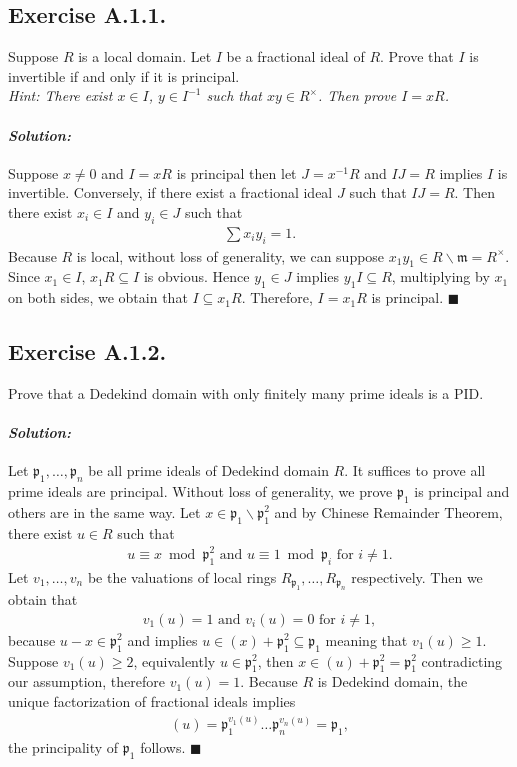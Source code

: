 \documentclass[12pt, a4paper]{article}
\newenvironment{solution}
  {\paragraph{\textit{Solution:}}\par\medskip}
  {\hfill$\blacksquare$\vspace{0.1cm}}
\begin{document}
\subsection*{Exercise A.1.1.} 
Suppose $R$ is a local domain. Let $I$ be a fractional ideal of $R$. Prove that $I$ is invertible if and only if it is principal. \\
\emph{Hint: There exist $x \in I$, $y \in I^{-1}$ such that $xy \in R^{\times}$. Then prove $I = xR$.}
\begin{solution}
    Suppose $x\neq 0$ and $I=xR$ is principal then let $J=x^{-1}R$ and $IJ=R$ implies $I$ is invertible. Conversely, if there exist a fractional ideal $J$ such that $IJ=R$. Then there exist $x_i\in I$ and $y_i\in J$ such that
    \begin{align*}
        \sum x_iy_i = 1.
    \end{align*} 
    Because $R$ is local, without loss of generality, we can suppose $x_1y_1\in R\backslash \mathfrak{m}=R^{\times}$. Since $x_1\in I$, $x_1R\subseteq I$ is obvious. Hence $y_1\in J$ implies $y_1I\subseteq R$, multiplying by $x_1$ on both sides, we obtain that 
    $I\subseteq x_1 R$. Therefore, $I=x_1R$ is principal.
\end{solution}


\subsection*{Exercise A.1.2.} 
Prove that a Dedekind domain with only finitely many prime ideals is a PID.
\begin{solution}
    Let $\mathfrak{p}_1,\dots,\mathfrak{p}_n$ be all prime ideals of Dedekind domain $R$.
    It suffices to prove all prime ideals are principal. Without loss of generality, we prove $\mathfrak{p}_1$ is principal and others are in 
    the same way. Let $x\in \mathfrak{p}_1\backslash \mathfrak{p}_1^2$ and by Chinese Remainder Theorem, there exist $u\in R$ such that 
    \begin{align*}
        u\equiv x \bmod \mathfrak{p}_1^2 \text{ and } u\equiv 1 \bmod \mathfrak{p}_i\text{ for }i\neq 1.
    \end{align*} 
    Let $v_1,\dots,v_n$ be the valuations of local rings $R_{\mathfrak{p}_1},\dots,R_{\mathfrak{p}_n}$ respectively. Then we obtain that 
    \begin{align*}
        v_1(u) = 1 \text{ and } v_i(u) = 0\text{ for }i\neq 1,
    \end{align*}
    because $u-x\in \mathfrak{p}_1^2$ and implies $u\in (x)+\mathfrak{p}_1^2\subseteq \mathfrak{p}_1$ meaning that $v_1(u)\ge 1$. Suppose $v_1(u)\ge 2$, equivalently $u\in \mathfrak{p}_1^2$, then $x\in (u)+\mathfrak{p}_1^2 = \mathfrak{p}_1^2$ contradicting our
    assumption, therefore $v_1(u)=1$. Because $R$ is Dedekind domain, the unique factorization of fractional ideals implies 
    \begin{align*}
        (u) = \mathfrak{p}_1^{v_1(u)}\dots\mathfrak{p}_n^{v_n(u)} = \mathfrak{p}_1,
    \end{align*}
    the principality of $\mathfrak{p}_1$ follows.
\end{solution}
\end{document}
